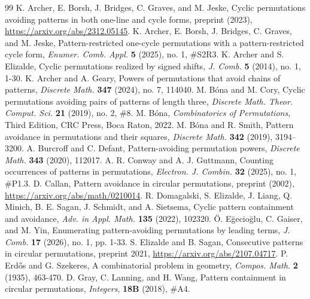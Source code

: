 \documentclass[10pt,a4paper]{amsart}
\numberwithin{equation}{section}
\begin{document}
\begin{thebibliography}{99}
 K. Archer, E. Borsh, J. Bridges, C. Graves, and M. Jeske, Cyclic permutations avoiding patterns in both one-line and cycle forms, preprint (2023), \url{https://arxiv.org/abs/2312.05145}.
 K. Archer, E. Borsh, J. Bridges, C. Graves, and M. Jeske, Pattern-restricted one-cycle permutations with a pattern-restricted cycle form, \textit{Enumer. Comb. Appl.} \textbf{5} (2025), no. 1, \#S2R3.
 K. Archer and S. Elizalde, Cyclic permutations realized by signed shifts, \textit{J. Comb.} \textbf{5} (2014), no. 1, 1-30.
 K. Archer and A. Geary, Powers of permutations that avoid chains of patterns, \textit{Discrete Math.} \textbf{347} (2024), no. 7, 114040.
 M. B\'{o}na and M. Cory, Cyclic permutations avoiding pairs of patterns of length three, \textit{Discrete Math. Theor. Comput. Sci.} \textbf{21} (2019), no. 2, \#8.
 M. B\'{o}na, \textit{Combinatorics of Permutations}, Third Edition, CRC Press, Boca Raton, 2022.
 M. B\'{o}na and R. Smith, Pattern avoidance in permutations and their squares, \textit{Discrete Math.} \textbf{342} (2019), 3194–3200.
 A. Burcroff and C. Defant, Pattern-avoiding permutation powers, \textit{Discrete Math.} \textbf{343} (2020), 112017.
 A. R. Conway and A. J. Guttmann, Counting occurrences of patterns in permutations, \textit{Electron. J. Combin.} \textbf{32} (2025), no. 1, \#P1.3.
 D. Callan, Pattern avoidance in circular permutations, preprint (2002), \url{https://arxiv.org/abs/math/0210014}.
 R. Domagalski, S. Elizalde, J. Liang, Q. Minich, B. E. Sagan, J. Schmidt, and A. Sietsema, Cyclic pattern containment and avoidance, \textit{Adv. in Appl. Math.} \textbf{135} (2022), 102320.
 \"{O}. E\u{g}ecio\u{g}lu, C. Gaiser, and M. Yin, Enumerating pattern-avoiding permutations by leading terms, \textit{J. Comb.} \textbf{17} (2026), no. 1, pp. 1-33.
 S. Elizalde and B. Sagan, Consecutive patterns in circular permutations, preprint 2021, \url{https://arxiv.org/abs/2107.04717}.
 P. Erd\H{o}s and G. Szekeres, A combinatorial problem in geometry, \textit{Compos. Math.} \textbf{2} (1935), 463-470.
 D. Gray, C. Lanning, and H. Wang, Pattern containment in circular permutations, \textit{Integers}, \textbf{18B} (2018), \#A4.

\end{thebibliography}
\end{document}
